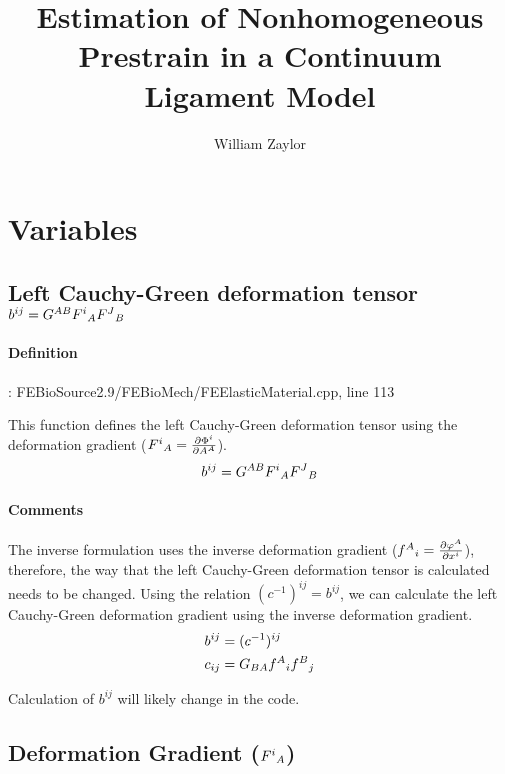 \documentclass{article}
\author{William Zaylor}
\title{Estimation of Nonhomogeneous Prestrain in a Continuum Ligament Model}
\begin{document}
\section*{Variables}
\subsection*{Left Cauchy-Green deformation tensor $b^{ij} = G^{AB}F^i\mathstrut_A F^J\mathstrut_B$}

    \paragraph{Definition}: FEBioSource2.9/FEBioMech/FEElasticMaterial.cpp, line 113

    This function defines the left Cauchy-Green deformation tensor using the deformation gradient ($F^i\mathstrut_A = \frac{\partial \Phi^i}{\partial A^A}$).
    \begin{equation*}
        b^{ij} =  G^{AB}F^i\mathstrut_A F^J\mathstrut_B
    \end{equation*}

    \paragraph{Comments}
    The inverse formulation uses the inverse deformation gradient ($f^A\mathstrut_i = \frac{\partial \varphi^A}{\partial x^i}$), therefore, the way that the left Cauchy-Green deformation tensor is calculated needs to be changed. Using the relation $(c^{-1})^{ij} = b^{ij}$, we can calculate the left Cauchy-Green deformation gradient using the inverse deformation gradient.
    \begin{equation*}
        \begin{split}
            b^{ij} &= (c^{-1})^{ij} \\
            c_{ij} &= G_{BA}f^A\mathstrut_i f^B\mathstrut_j
        \end{split}
    \end{equation*}

    Calculation of $b^{ij}$ will likely change in the code.

\subsection*{Deformation Gradient ($F^i\mathstrut_A$)}
\end{document}
